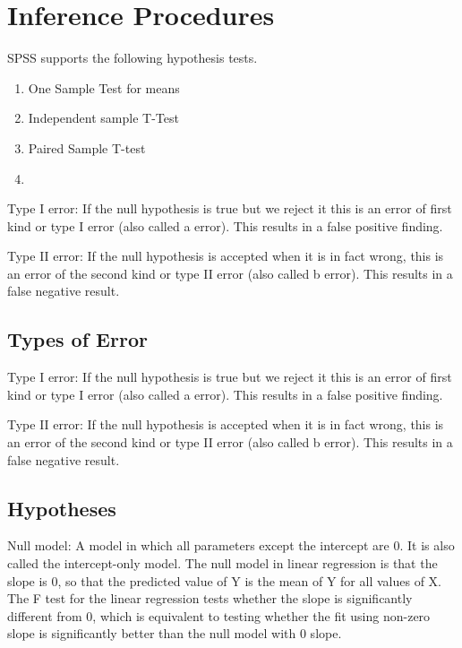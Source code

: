 \section{Inference Procedures}

SPSS supports the following hypothesis tests.
\begin{enumerate}
\item One Sample Test for means
\item Independent sample T-Test
\item Paired Sample T-test
\item
\end{enumerate}


\begin{minipage}[b]{0.5\linewidth}
Type I error: If the null hypothesis is true but we reject it this is an error of first kind or type I error (also called a error). This results in a false positive finding.

Type II error: If the null hypothesis is accepted when it is in fact wrong, this is an error of the second kind or type II error (also called b error). This results in a false negative result.
\end{minipage}

\subsection{Types of Error}
Type I error: If the null hypothesis is true but we reject it this is an error of first kind or type I error (also called a error). This results in a false positive finding.

Type II error: If the null hypothesis is accepted when it is in fact wrong, this is an error of the second kind or type II error (also called b error). This results in a false negative result.

\subsection{Hypotheses}

Null model: A model in which all parameters except the intercept are 0. It is also called the intercept-only model. The null model in linear regression is that the slope is 0, so that the predicted value of Y is the mean of Y for all values of X. The F test for the linear regression tests whether the slope is significantly different from 0, which is equivalent to testing whether the fit using non-zero slope is significantly better than the null model with 0 slope.


